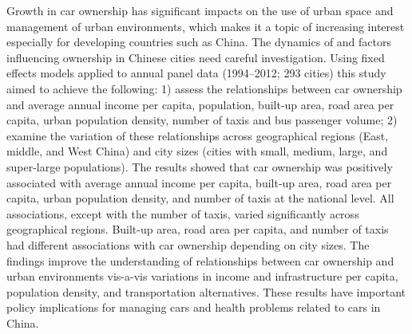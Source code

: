 Growth in car ownership has significant impacts on the use of urban space and management of urban environments, which makes it a topic of increasing interest especially for developing countries such as China. The dynamics of and factors influencing ownership in Chinese cities need careful investigation. Using fixed effects models applied to annual panel data (1994–2012; 293 cities) this study aimed to achieve the following: 1) assess the relationships between car ownership and average annual income per capita, population, built-up area, road area per capita, urban population density, number of taxis and bus passenger volume; 2) examine the variation of these relationships across geographical regions (East, middle, and West China) and city sizes (cities with small, medium, large, and super-large populations). The results showed that car ownership was positively associated with average annual income per capita, built-up area, road area per capita, urban population density, and number of taxis at the national level. All associations, except with the number of taxis, varied significantly across geographical regions. Built-up area, road area per capita, and number of taxis had different associations with car ownership depending on city sizes. The findings improve the understanding of relationships between car ownership and urban environments vis-a-vis variations in income and infrastructure per capita, population density, and transportation alternatives. These results have important policy implications for managing cars and health problems related to cars in China.